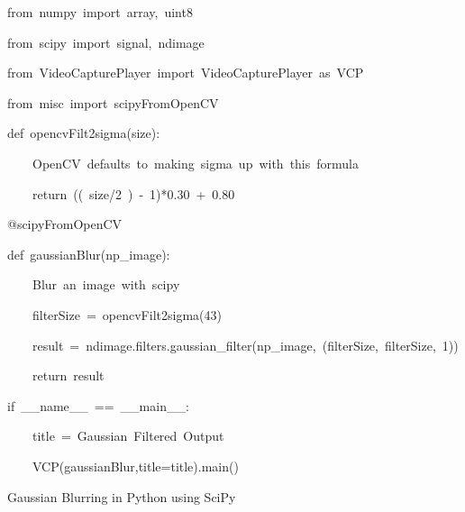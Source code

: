 \documentclass[english]{IEEEtran}
\theoremstyle{plain}
\newenvironment{lyxcode}
{\par\begin{list}{}{
\setlength{\rightmargin}{\leftmargin}
\setlength{\listparindent}{0pt}%
\raggedright
\setlength{\itemsep}{0pt}
\setlength{\parsep}{0pt}
\normalfont\ttfamily}%
 \item[]}
{\end{list}}
\begin{document}
%
\begin{algorithm*}
\begin{lyxcode}
from~numpy~import~array,~uint8

from~scipy~import~signal,~ndimage~

from~VideoCapturePlayer~import~VideoCapturePlayer~as~VCP~

from~misc~import~scipyFromOpenCV



def~opencvFilt2sigma(size):

~~~~\textquotedbl{}\textquotedbl{}\textquotedbl{}OpenCV~defaults~to~making~sigma~up~with~this~formula\textquotedbl{}\textquotedbl{}\textquotedbl{}

~~~~return~((~size/2~)~-~1){*}0.30~+~0.80



@scipyFromOpenCV

def~gaussianBlur(np\_image):

~~~~\textquotedbl{}\textquotedbl{}\textquotedbl{}Blur~an~image~with~scipy\textquotedbl{}\textquotedbl{}\textquotedbl{}

~~~~filterSize~=~opencvFilt2sigma(43)

~~~~result~=~ndimage.filters.gaussian\_filter(np\_image,~(filterSize,~filterSize,~1))

~~~~return~result



if~\_\_name\_\_~==~\textquotedbl{}\_\_main\_\_\textquotedbl{}:

~~~~title~=~\textquotedbl{}Gaussian~Filtered~Output\textquotedbl{}

~~~~VCP(gaussianBlur,title=title).main()
\end{lyxcode}
\caption{\label{alg:Gaussian-Python-SciPy}Gaussian Blurring in Python using
SciPy}

\end{algorithm*}
\end{document}
